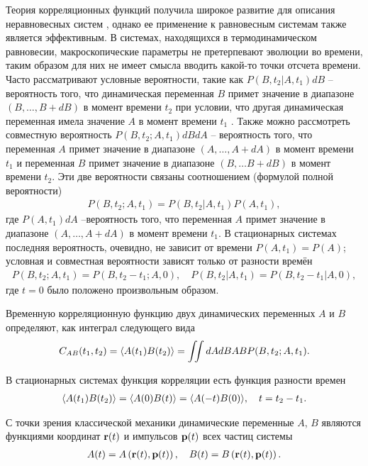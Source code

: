 Теория корреляционных функций получила широкое развитие для описания неравновесных систем \cite{zwanzig1965}, однако ее применение к равновесным системам также является эффективным. В системах, находящихся в термодинамическом равновесии, макроскопические параметры не претерпевают эволюции во времени, таким образом для них не имеет смысла вводить какой-то точки отсчета времени. Часто рассматривают условные вероятности, такие как $P(B, t_2 \vert A, t_1) dB$ -- вероятность того, что динамическая переменная $B$ примет значение в диапазоне $(B, \dots, B + dB)$ в момент времени $t_2$ при условии, что другая динамическая переменная имела значение $A$ в момент времени $t_1$ \cite{nitzan2006}. Также можно рассмотреть совместную вероятность $P(B, t_2; A, t_1) dB dA$ -- вероятность того, что переменная $A$ примет значение в диапазоне $(A, \dots, A+dA)$ в момент времени $t_1$ и переменная $B$ примет значение в диапазоне $(B, \dots B+dB)$ в момент времени $t_2$. Эти две вероятности связаны соотношением (формулой полной вероятности)
\begin{gather}
    P(B, t_2; A, t_1) = P(B, t_2 \vert A, t_1) P(A, t_1), 
\end{gather}
где $P(A, t_1) dA$ --вероятность того, что переменная $A$ примет значение в диапазоне $(A, \dots, A+dA)$ в момент времени $t_1$. В стационарных системах последняя вероятность, очевидно, не зависит от времени $P(A, t_1) = P(A)$; условная и совместная вероятности зависят только от разности времён
\begin{gather}
    P(B, t_2; A, t_1) = P(B, t_2 - t_1; A, 0), \quad P(B, t_2 \vert A, t_1) = P(B, t_2 - t_1 \vert A, 0),
\end{gather}
%
где $t = 0$ было положено произвольным образом.\par
Временную корреляционную функцию двух динамических переменных $A$ и $B$ определяют, как интеграл следующего вида 
\begin{gather}
    C_{AB}(t_1, t_2) = \langle  A(t_1) B(t_2)  \rangle = \iint dA dB AB P(B, t_2; A, t_1). \label{part1-correlation-function-definition}
\end{gather}

В стационарных системах функция корреляции есть функция разности времен
\begin{gather}
    \langle  A(t_1) B(t_2)  \rangle = \langle  A(0) B(t)  \rangle = \langle  A(-t) B(0)  \rangle, \quad t = t_2 - t_1.
\end{gather}

С точки зрения классической механики динамические переменные $A$, $B$ являются функциями координат $\mathbf{r}(t)$ и импульсов $\mathbf{p}(t)$ всех частиц системы
\begin{gather}
    A(t) = A \left( \mathbf{r}(t), \mathbf{p}(t) \right), \quad B(t) = B \left( \mathbf{r}(t), \mathbf{p}(t) \right).
\end{gather}

